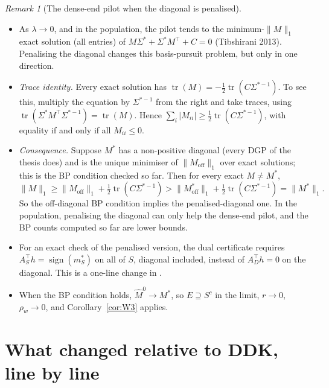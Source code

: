 \documentclass[11pt,a4paper]{article}
\numberwithin{equation}{section}
\theoremstyle{plain}
\theoremstyle{remark}
\newtheorem{remark}[theorem]{Remark}
\DeclareMathOperator{\sign}{sign}
\DeclareMathOperator{\tr}{tr}
\begin{document}
\begin{remark}[The dense-end pilot when the diagonal is penalised]\label{rem:W6}\leavevmode
\begin{itemize}
  \item As $\lambda\to0$, and in the population, the pilot tends to the minimum-$\|M\|_1$ exact solution (all entries) of $M\Sigma^*+\Sigma^*M^\top+C=0$ (Tibshirani 2013). Penalising the diagonal changes this basis-pursuit problem, but only in one direction.
  \item \emph{Trace identity.} Every exact solution has $\tr(M)=-\tfrac12\tr(C\Sigma^{*-1})$. To see this, multiply the equation by $\Sigma^{*-1}$ from the right and take traces, using $\tr(\Sigma^*M^\top\Sigma^{*-1})=\tr(M)$. Hence $\sum_i|M_{ii}|\ge\tfrac12\tr(C\Sigma^{*-1})$, with equality if and only if all $M_{ii}\le0$.
  \item \emph{Consequence.} Suppose $M^*$ has a non-positive diagonal (every DGP of the thesis does) and is the unique minimiser of $\|M_{\mathrm{off}}\|_1$ over exact solutions; this is the BP condition checked so far. Then for every exact $M\ne M^*$,
  \[
  \|M\|_1\ge\|M_{\mathrm{off}}\|_1+\tfrac12\tr(C\Sigma^{*-1})>\|M^*_{\mathrm{off}}\|_1+\tfrac12\tr(C\Sigma^{*-1})=\|M^*\|_1 .
  \]
  So the off-diagonal BP condition implies the penalised-diagonal one. In the population, penalising the diagonal can only help the dense-end pilot, and the BP counts computed so far are lower bounds.
  \item For an exact check of the penalised version, the dual certificate requires $A_S^\top h=\sign(m^*_S)$ on all of $S$, diagonal included, instead of $A_D^\top h=0$ on the diagonal. This is a one-line change in .
  \item When the BP condition holds, $\hat M^0\to M^*$, so $E\supseteq S^c$ in the limit, $r\to0$, $\rho_w\to0$, and Corollary~\ref{cor:W3} applies.
\end{itemize}
\end{remark}

\section{What changed relative to DDK, line by line}\label{sec:table}
\end{document}
